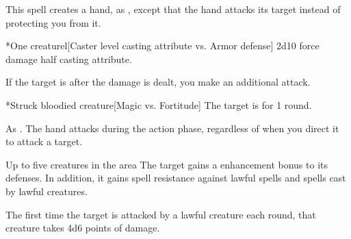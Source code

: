 \begin{spellheader}
    \spellrng{\rngmed}
    \spelldur{\durshort \dismissable}
\end{spellheader}
\begin{spelleffects}
    \spelleffect This spell creates a hand, as , except that the hand attacks its target instead of protecting you from it.
    \begin{spelltarget}*{One creature}l[Caster level \add casting attribute vs. Armor defense]
        \spellsuccess 2d10 force damage \add half casting attribute.

        If the target is \bloodied after the damage is dealt, you make an additional attack.
        \begin{spelltarget}*{Struck bloodied creature}[Magic vs. Fortitude]
            \spellsuccess The target is \dazed for 1 round.
        \end{spelltarget}
    \end{spelltarget}
\end{spelleffects}
\begin{spellfooter}
    \spellnotes As . The hand attacks during the action phase, regardless of when you direct it to attack a target.
\end{spellfooter}

\begin{spellheader}
    \spelldur{\durshort \dismissable}
\end{spellheader}
\begin{spelleffects}
    \begin{spelltargets}{Up to five creatures in the area}
        The target gains a  enhancement bonus to its defenses. In addition, it gains spell resistance against lawful spells and spells cast by lawful creatures.
        \par The first time the target is attacked by a lawful creature each round, that creature takes 4d6 points of damage.
    \end{spelltargets}
\end{spelleffects}
\begin{spellfooter}
    
\end{spellfooter}

